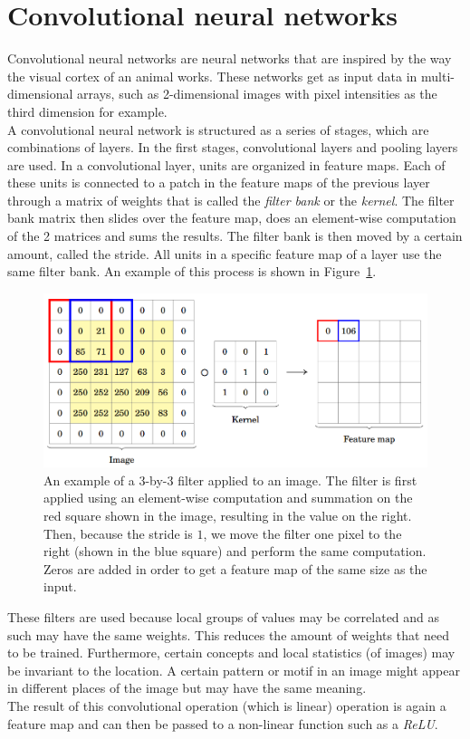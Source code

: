\section{Convolutional neural networks}
Convolutional neural networks are neural networks that are inspired by the way the visual cortex of an animal works.
These networks get as input data in multi-dimensional arrays, such as 2-dimensional images with pixel intensities as the third dimension for example.\\
A convolutional neural network is structured as a series of stages, which are combinations of layers.
In the first stages, convolutional layers and pooling layers are used.
In a convolutional layer, units are organized in feature maps.
Each of these units is connected to a patch in the feature maps of the previous layer through a matrix of weights that is called the \emph{filter bank} or the \textit{kernel}.
The filter bank matrix then slides over the feature map, does an element-wise computation of the 2 matrices and sums the results.
The filter bank is then moved by a certain amount, called the stride.
All units in a specific feature map of a layer use the same filter bank.
An example of this process is shown in Figure~\ref{fig:cnnfilter}.
\begin{figure}[htb]
    \centering
    \includegraphics[width=\linewidth]{images/cnnfilter.png}
    \caption[An example of a 3-by-3 filter applied to an image]{An example of a 3-by-3 filter applied to an image. The filter is first applied using an element-wise computation and summation on the red square shown in the image, resulting in the value on the right. Then, because the stride is $1$, we move the filter one pixel to the right (shown in the blue square) and perform the same computation. Zeros are added in order to get a feature map of the same size as the input.}
    \label{fig:cnnfilter}
\end{figure}

These filters are used because local groups of values may be correlated and as such may have the same weights. This reduces the amount of weights that need to be trained. Furthermore, certain concepts and local statistics (of images) may be invariant to the location. A certain pattern or motif in an image might appear in different places of the image but may have the same meaning.\\
The result of this convolutional operation (which is linear) operation is again a feature map and can then be passed to a non-linear function such as a \textit{ReLU}.\\

